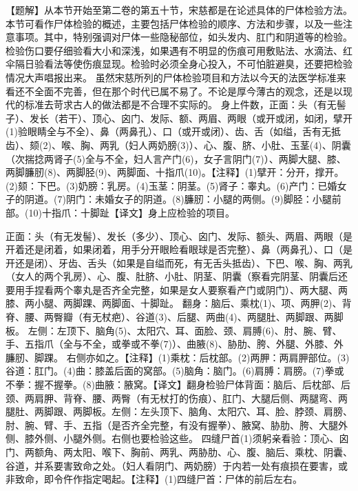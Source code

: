 \documentclass[12pt,UTF8]{ctexbook}
\begin{document}
【题解】从本节开始至第二卷的第五十节，宋慈都是在论述具体的尸体检验方法。本节可看作尸体检验的概述，主要包括尸体检验的顺序、方法和步骤，以及一些注意事项。其中，特别强调对尸体一些隐秘部位，如头发内、肛门和阴道等的检验。检验伤口要仔细验看大小和深浅，如果遇有不明显的伤痕可用敷贴法、水滴法、红伞隔日验看法等使伤痕显现。检验时必须全身心投入，不可怕脏避臭，还要把检验情况大声唱报出来。
虽然宋慈所列的尸体检验项目和方法以今天的法医学标准来看还不全面不完善，但在那个时代已属不易了。不论是厚今薄古的观念，还是以现代的标准去苛求古人的做法都是不合理不实际的。
身上件数，正面：头（有无髻子）、发长（若干）、顶心、囟门、发际、额、两眉、两眼（或开或闭，如闭，擘开(1)验眼睛全与不全）、鼻（两鼻孔）、口（或开或闭）、齿、舌（如缢，舌有无抵齿）、颏(2)、喉、胸、两乳（妇人两奶膀(3)）、心、腹、脐、小肚、玉茎(4)、阴囊（次揣捻两肾子(5)全与不全，妇人言产门(6)，女子言阴门(7)）、两脚大腿、膝、两脚臁肕(8)、两脚胫(9)、两脚面、十指爪(10)。【注释】(1)擘开：分开，撑开。(2)颏：下巴。(3)奶膀：乳房。(4)玉茎：阴茎。(5)肾子：睾丸。(6)产门：已婚女子的阴道。(7)阴门：未婚女子的阴道。(8)臁肕：小腿的两侧。(9)脚胫：小腿前部。(10)十指爪：十脚趾【译文】身上应检验的项目。

正面：头（有无发髻）、发长（多少）、顶心、囟门、发际、额头、两眉、两眼（是开着还是闭着，如果闭着，用手分开眼睑看眼球是否完整）、鼻（两鼻孔）、口（是开还是闭）、牙齿、舌头（如果是自缢而死，有无舌头抵齿）、下巴、喉、胸、两乳（女人的两个乳房）、心、腹、肚脐、小肚、阴茎、阴囊（察看完阴茎、阴囊后还要用手捏看两个睾丸是否齐全完整，如果是女人要察看产门或阴门）、两大腿、两膝、两小腿、两脚踝、两脚面、十脚趾。
翻身：脑后、乘枕(1)、项、两胛(2)、背脊、腰、两臀瓣（有无杖疤）、谷道(3)、后腿、两曲(4)、两腿肚、两脚跟、两脚板。
左侧：左顶下、脑角(5)、太阳穴、耳、面脸、颈、肩膊(6)、肘、腕、臂、手、五指爪（全与不全，或拳或不拳(7)）、曲腋(8)、胁肋、胯、外腿、外膝、外臁肕、脚踝。
右侧亦如之。【注释】(1)乘枕：后枕部。(2)两胛：两肩胛部位。(3)谷道：肛门。(4)曲：膝盖后面的窝部。(5)脑角：脑门。(6)肩膊：肩膀。(7)拳或不拳：握不握拳。(8)曲腋：腋窝。【译文】翻身检验尸体背面：脑后、后枕部、后颈、两肩胛、背脊、腰、两臀（有无杖打的伤痕）、肛门、大腿后侧、两腿弯、两腿肚、两脚跟、两脚板。左侧：左头顶下、脑角、太阳穴、耳、脸、脖颈、肩膀、肘、腕、臂、手、五指（是否齐全完整，有没有握拳）、腋窝、胁肋、胯、大腿外侧、膝外侧、小腿外侧。右侧也要检验这些。
四缝尸首(1)须躬亲看验：顶心、囟门、两额角、两太阳、喉下、胸前、两乳、两胁肋、心、腹、脑后、乘枕、阴囊、谷道，并系要害致命之处。（妇人看阴门、两奶膀）于内若一处有痕损在要害，或非致命，即令仵作指定喝起。【注释】(1)四缝尸首：尸体的前后左右。
\end{document}
